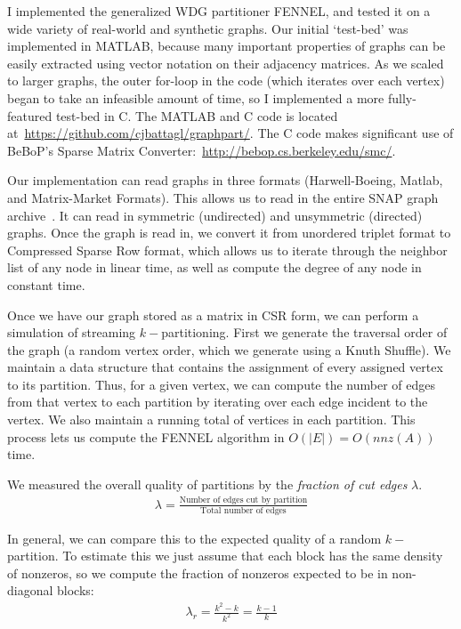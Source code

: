 \documentclass[11pt]{article}
\begin{document}
I implemented the generalized WDG partitioner FENNEL, and tested it on a wide variety of real-world and synthetic graphs. Our initial `test-bed' was implemented in MATLAB, because many important properties of graphs can be easily extracted using vector notation on their adjacency matrices. As we scaled to larger graphs, the outer for-loop in the code (which iterates over each vertex) began to take an infeasible amount of time, so I implemented a more fully-featured test-bed in C. The MATLAB and C code is located at~\url{https://github.com/cjbattagl/graphpart/}. The C code makes significant use of BeBoP's Sparse Matrix Converter:~\url{http://bebop.cs.berkeley.edu/smc/}.

Our implementation can read graphs in three formats (Harwell-Boeing, Matlab, and Matrix-Market Formats). This allows us to read in the entire SNAP graph archive~\cite{Leskovec-data}. It can read in symmetric (undirected) and unsymmetric (directed) graphs. Once the graph is read in, we convert it from unordered triplet format to Compressed Sparse Row format, which allows us to iterate through the neighbor list of any node in linear time, as well as compute the degree of any node in constant time.

Once we have our graph stored as a matrix in CSR form, we can perform a simulation of streaming $k-$partitioning. First we generate the traversal order of the graph (a random vertex order, which we generate using a Knuth Shuffle). We maintain a data structure that contains the assignment of every assigned vertex to its partition. Thus, for a given vertex, we can compute the number of edges from that vertex to each partition by iterating over each edge incident to the vertex. We also maintain a running total of vertices in each partition. This process lets us compute the FENNEL algorithm in $O(|E|)=O(nnz(A))$ time. 

We measured the overall quality of partitions by the \textit{fraction of cut edges} $\lambda$.
\begin{align}\lambda = \frac{\text{Number of edges cut by partition}}{\text{Total number of edges}}\end{align}

In general, we can compare this to the expected quality of a random $k-$partition. To estimate this we just assume that each block has the same density of nonzeros, so we compute the fraction of nonzeros expected to be in non-diagonal blocks:
\begin{align}\lambda_r = \frac{k^2 - k}{k^2} = \frac{k-1}{k} \end{align}
\end{document}
